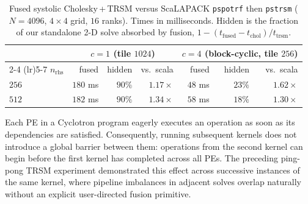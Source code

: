 \documentclass[sigplan, nonacm]{acmart}
\begin{document}


\begin{table}[t]
\centering
\caption{Fused systolic Cholesky\,+\,TRSM versus ScaLAPACK
\texttt{pspotrf} then \texttt{pstrsm} ($N=4096$, $4\times4$ grid,
$16$ ranks). Times in milliseconds. Hidden is the fraction of our
standalone 2-D solve absorbed by fusion,
$1-(t_{\mathrm{fused}}-t_{\mathrm{chol}})/t_{\mathrm{trsm}}$.}
\label{tab:chol-fusion}
\small
\begin{tabular}{@{}l rrr rrr@{}}
\toprule
 & \multicolumn{3}{c}{$c{=}1$ (tile $1024$)} & \multicolumn{3}{c}{$c{=}4$ (block-cyclic, tile $256$)} \\
\cmidrule(lr){2-4} \cmidrule(lr){5-7}
$n_{\mathrm{rhs}}$ & fused & hidden & vs.\ scala
                   & fused & hidden & vs.\ scala \\
\midrule
$256$ & $180$ ms & $90\%$ & $1.17\times$ & $48$ ms & $23\%$ & $1.62\times$ \\
$512$ & $182$ ms & $90\%$ & $1.34\times$ & $58$ ms & $18\%$ & $1.30\times$ \\
\bottomrule
\end{tabular}
\end{table}


Each PE in a Cyclotron program eagerly executes an operation as soon as its dependencies are satisfied. Consequently, running subsequent kernels does not introduce a global barrier between them: operations from the second kernel can begin before the first kernel has completed across all PEs. The preceding ping-pong TRSM experiment demonstrated this effect across successive instances of the same kernel, where pipeline imbalances in adjacent solves overlap naturally without an explicit user-directed fusion primitive.
\end{document}
